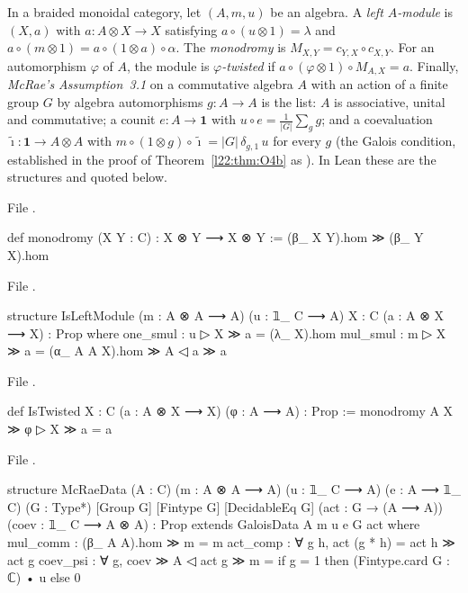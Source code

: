 \begin{definition}\label{l22:def:twisted}
In a braided monoidal category, let $(A,m,u)$ be an algebra. A \emph{left $A$-module} is $(X,a)$ with $a:A\otimes X\to X$
satisfying $a\circ(u\otimes1)=\lambda$ and $a\circ(m\otimes1)=a\circ(1\otimes a)\circ\alpha$. The \emph{monodromy} is
$M_{X,Y}=c_{Y,X}\circ c_{X,Y}$. For an automorphism $\varphi$ of $A$, the module is \emph{$\varphi$-twisted} if
$a\circ(\varphi\otimes1)\circ M_{A,X}=a$. Finally, \emph{McRae's Assumption~3.1} on a commutative algebra $A$ with an action
of a finite group $G$ by algebra automorphisms $g:A\to A$ is the list: $A$ is associative, unital and commutative; a
counit $e:A\to\mathbf 1$ with $u\circ e=\frac1{|G|}\sum_gg$; and a coevaluation $\tilde\imath:\mathbf 1\to A\otimes A$
with $m\circ(1\otimes g)\circ\tilde\imath=|G|\,\delta_{g,1}\,u$ for every $g$ (the Galois condition, established in the proof of Theorem~\ref{l22:thm:O4b} as ).
In Lean these are the structures  and  quoted below.
\end{definition}
\noindent File .
\begin{leancode}
def monodromy (X Y : C) : X ⊗ Y ⟶ X ⊗ Y := (β_ X Y).hom ≫ (β_ Y X).hom
\end{leancode}
\noindent File .
\begin{leancode}
structure IsLeftModule (m : A ⊗ A ⟶ A) (u : 𝟙_ C ⟶ A) {X : C} (a : A ⊗ X ⟶ X) : Prop where
  one_smul : u ▷ X ≫ a = (λ_ X).hom
  mul_smul : m ▷ X ≫ a = (α_ A A X).hom ≫ A ◁ a ≫ a
\end{leancode}
\noindent File .
\begin{leancode}
def IsTwisted {X : C} (a : A ⊗ X ⟶ X) (φ : A ⟶ A) : Prop :=
  monodromy A X ≫ φ ▷ X ≫ a = a
\end{leancode}
\noindent File .
\begin{leancode}
structure McRaeData (A : C) (m : A ⊗ A ⟶ A) (u : 𝟙_ C ⟶ A) (e : A ⟶ 𝟙_ C)
    (G : Type*) [Group G] [Fintype G] [DecidableEq G] (act : G → (A ⟶ A))
    (coev : 𝟙_ C ⟶ A ⊗ A) : Prop extends GaloisData A m u e G act where
  mul_comm : (β_ A A).hom ≫ m = m
  act_comp : ∀ g h, act (g * h) = act h ≫ act g
  coev_psi : ∀ g, coev ≫ A ◁ act g ≫ m = if g = 1 then (Fintype.card G : ℂ) • u else 0
\end{leancode}
